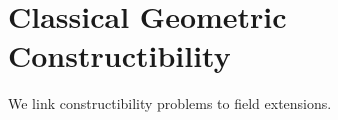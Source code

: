 \section{Classical Geometric Constructibility}
\label{sec:constructible-geometry}

We link constructibility problems to field extensions.
